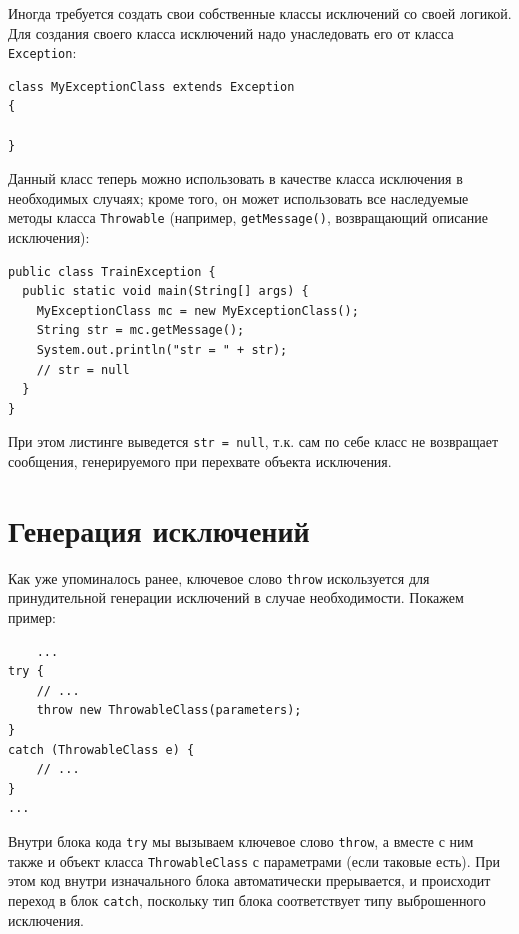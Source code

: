 Иногда требуется создать свои собственные классы исключений со своей логикой. Для создания своего класса исключений надо унаследовать его от класса \verb|Exception|:

\begin{lstlisting}
class MyExceptionClass extends Exception
{

}
\end{lstlisting}

Данный класс теперь можно использовать в качестве класса исключения в необходимых случаях; кроме того, он может использовать все наследуемые методы класса \verb|Throwable| (например, \verb|getMessage()|, возвращающий описание исключения):

\begin{lstlisting}
public class TrainException {
  public static void main(String[] args) {
    MyExceptionClass mc = new MyExceptionClass();
    String str = mc.getMessage();
    System.out.println("str = " + str);
    // str = null
  }
}
\end{lstlisting}

При этом листинге выведется \verb|str = null|, т.к. сам по себе класс не возвращает сообщения, генерируемого при перехвате объекта исключения.

\section{Генерация исключений}

Как уже упоминалось ранее, ключевое слово \verb|throw| искользуется для принудительной генерации исключений в случае необходимости. Покажем пример:

\begin{lstlisting}
    ...
try {
    // ...
    throw new ThrowableClass(parameters);
}
catch (ThrowableClass e) {
    // ...
}
...
\end{lstlisting}

Внутри блока кода \verb|try| мы вызываем ключевое слово \verb|throw|, а вместе с ним также и объект класса \verb|ThrowableClass| с параметрами (если таковые есть). При этом код внутри изначального блока автоматически прерывается, и происходит переход в блок \verb|catch|, поскольку тип блока соответствует типу выброшенного исключения.

\label{pages_total}

